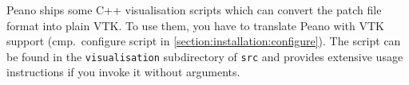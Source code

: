 Peano ships some C++ visualisation scripts which can convert the patch file
format into plain VTK.
To use them, you have to translate Peano with VTK support (cmp.~configure
script in \ref{section:installation:configure}).
The script can be found in the \texttt{visualisation} subdirectory of
\texttt{src} and provides extensive usage instructions if you invoke it without
arguments.

% 
% 
% 
